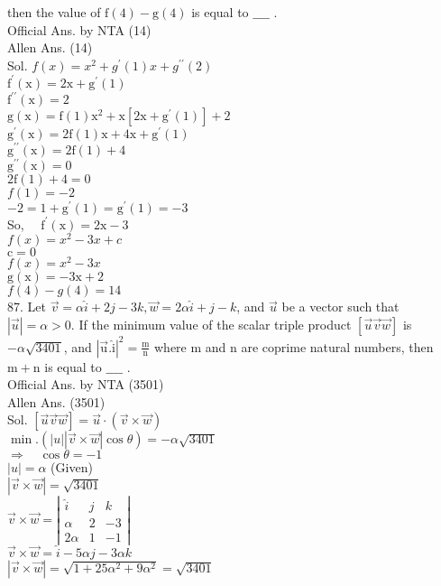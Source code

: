 \documentclass[10pt]{article}
\begin{document}
then the value of \(\mathrm{f}(4)-\mathrm{g}(4)\) is equal to \(\_\_\_\_\) .\\
Official Ans. by NTA (14)\\
Allen Ans. (14)\\
Sol. \(f(x)=x^{2}+g^{\prime}(1) x+g^{\prime \prime}(2)\)\\
\(\mathrm{f}^{\prime}(\mathrm{x})=2 \mathrm{x}+\mathrm{g}^{\prime}(1)\)\\
\(\mathrm{f}^{\prime \prime}(\mathrm{x})=2\)\\
\(\mathrm{g}(\mathrm{x})=\mathrm{f}(1) \mathrm{x}^{2}+\mathrm{x}\left[2 \mathrm{x}+\mathrm{g}^{\prime}(1)\right]+2\)\\
\(\mathrm{g}^{\prime}(\mathrm{x})=2 \mathrm{f}(1) \mathrm{x}+4 \mathrm{x}+\mathrm{g}^{\prime}(1)\)\\
\(\mathrm{g}^{\prime \prime}(\mathrm{x})=2 \mathrm{f}(1)+4\)\\
\(\mathrm{g}^{\prime \prime}(\mathrm{x})=0\)\\
\(2 \mathrm{f}(1)+4=0\)\\
\(f(1)=-2\)\\
\(-2=1+\mathrm{g}^{\prime}(1)=\mathrm{g}^{\prime}(1)=-3\)\\
So, \(\quad \mathrm{f}^{\prime}(\mathrm{x})=2 \mathrm{x}-3\)\\
\(f(x)=x^{2}-3 x+c\)\\
\(\mathrm{c}=0\)\\
\(f(x)=x^{2}-3 x\)\\
\(\mathrm{g}(\mathrm{x})=-3 \mathrm{x}+2\)\\
\(f(4)-g(4)=14\)\\
87. Let \(\vec{v}=\alpha \hat{i}+2 j-3 k, \vec{w}=2 \alpha \hat{i}+j-k\), and \(\vec{u}\) be a vector such that \(|\vec{u}|=\alpha>0\). If the minimum value of the scalar triple product \([\vec{u} \vec{v} \vec{w}]\) is \(-\alpha \sqrt{3401}\), and \(|\overrightarrow{\mathrm{u}} . \hat{\mathrm{i}}|^{2}=\frac{\mathrm{m}}{\mathrm{n}}\) where m and n are coprime natural numbers, then \(\mathrm{m}+\mathrm{n}\) is equal to \(\_\_\_\_\) .\\
Official Ans. by NTA (3501)\\
Allen Ans. (3501)\\
Sol. \([\vec{u} \vec{v} \vec{w}]=\vec{u} \cdot(\vec{v} \times \vec{w})\)\\
\(\min .(|u||\vec{v} \times \vec{w}| \cos \theta)=-\alpha \sqrt{3401}\)\\
\(\Rightarrow \quad \cos \theta=-1\)\\
\(|u|=\alpha\) (Given)\\
\(|\vec{v} \times \vec{w}|=\sqrt{3401}\)\\
\(\vec{v} \times \vec{w}=\left|\begin{array}{ccc}\hat{i} & j & k \\ \alpha & 2 & -3 \\ 2 \alpha & 1 & -1\end{array}\right|\)\\
\(\vec{v} \times \vec{w}=\hat{i}-5 \alpha j-3 \alpha k\)\\
\(|\vec{v} \times \vec{w}|=\sqrt{1+25 \alpha^{2}+9 \alpha^{2}}=\sqrt{3401}\)
\end{document}
